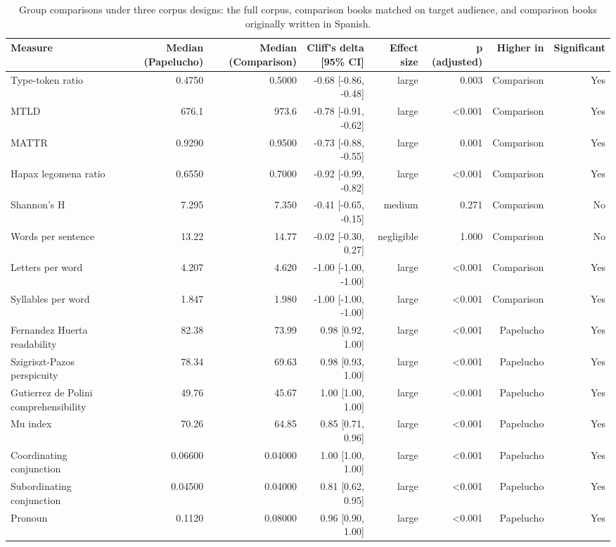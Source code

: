 \begin{table}[htbp]
\centering
\small
\caption{Group comparisons under three corpus designs: the full corpus, comparison books matched on target audience, and comparison books originally written in Spanish.}
\label{tab:sensitivity-designs}
\begin{tabular}{lrrrrrrr}
\toprule
\textbf{Measure} & \textbf{Median (Papelucho)} & \textbf{Median (Comparison)} & \textbf{Cliff's delta [95\% CI]} & \textbf{Effect size} & \textbf{p (adjusted)} & \textbf{Higher in} & \textbf{Significant} \\
\midrule
Type-token ratio & 0.4750 & 0.5000 & -0.68 [-0.86, -0.48] & large & 0.003 & Comparison & Yes \\
MTLD & 676.1 & 973.6 & -0.78 [-0.91, -0.62] & large & <0.001 & Comparison & Yes \\
MATTR & 0.9290 & 0.9500 & -0.73 [-0.88, -0.55] & large & 0.001 & Comparison & Yes \\
Hapax legomena ratio & 0.6550 & 0.7000 & -0.92 [-0.99, -0.82] & large & <0.001 & Comparison & Yes \\
Shannon's H & 7.295 & 7.350 & -0.41 [-0.65, -0.15] & medium & 0.271 & Comparison & No \\
Words per sentence & 13.22 & 14.77 & -0.02 [-0.30, 0.27] & negligible & 1.000 & Comparison & No \\
Letters per word & 4.207 & 4.620 & -1.00 [-1.00, -1.00] & large & <0.001 & Comparison & Yes \\
Syllables per word & 1.847 & 1.980 & -1.00 [-1.00, -1.00] & large & <0.001 & Comparison & Yes \\
Fernandez Huerta readability & 82.38 & 73.99 & 0.98 [0.92, 1.00] & large & <0.001 & Papelucho & Yes \\
Szigriszt-Pazos perspicuity & 78.34 & 69.63 & 0.98 [0.93, 1.00] & large & <0.001 & Papelucho & Yes \\
Gutierrez de Polini comprehensibility & 49.76 & 45.67 & 1.00 [1.00, 1.00] & large & <0.001 & Papelucho & Yes \\
Mu index & 70.26 & 64.85 & 0.85 [0.71, 0.96] & large & <0.001 & Papelucho & Yes \\
Coordinating conjunction & 0.06600 & 0.04000 & 1.00 [1.00, 1.00] & large & <0.001 & Papelucho & Yes \\
Subordinating conjunction & 0.04500 & 0.04000 & 0.81 [0.62, 0.95] & large & <0.001 & Papelucho & Yes \\
Pronoun & 0.1120 & 0.08000 & 0.96 [0.90, 1.00] & large & <0.001 & Papelucho & Yes \\

\end{tabular}
\end{table}
